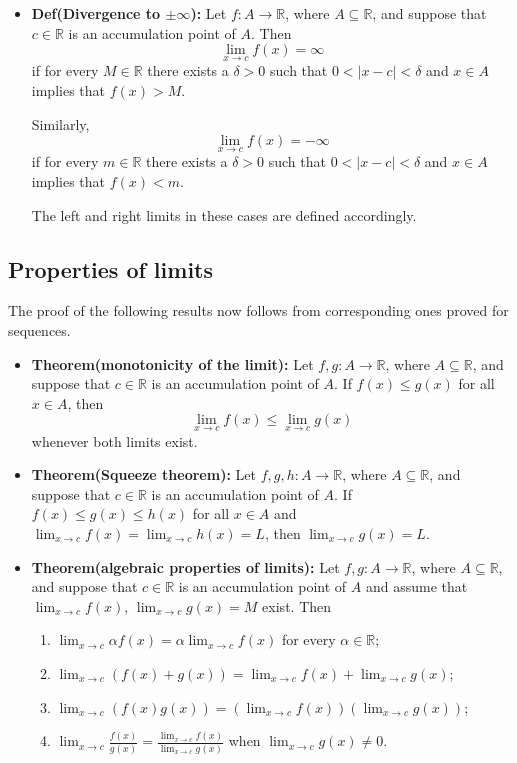 \documentclass{article}
\begin{document}
\begin{itemize}
\item \textbf{Def(Divergence to $\pm \infty$):} Let $f: A \to \mathbb{R}$, where $A \subseteq \mathbb{R}$, and suppose that $c \in \mathbb{R}$ is an accumulation point of $A$. Then
\[
\lim_{x \to c} f(x) = \infty
\]
if for every $M \in \mathbb{R}$ there exists a $\delta > 0$ such that $0 < |x - c| < \delta$ and $x \in A$ implies that $f(x) > M$.

Similarly,
\[
\lim_{x \to c} f(x) = -\infty
\]
if for every $m \in \mathbb{R}$ there exists a $\delta > 0$ such that $0 < |x - c| < \delta$ and $x \in A$ implies that $f(x) < m$.

The left and right limits in these cases are defined accordingly.
\end{itemize}

\subsection{Properties of limits}

The proof of the following results now follows from corresponding ones proved for sequences.

\begin{itemize}
\item \textbf{Theorem(monotonicity of the limit):} Let $f, g: A \to \mathbb{R}$, where $A \subseteq \mathbb{R}$, and suppose that $c \in \mathbb{R}$ is an accumulation point of $A$. If $f(x) \leq g(x)$ for all $x \in A$, then
\[
\lim_{x \to c} f(x) \leq \lim_{x \to c} g(x)
\]
whenever both limits exist.

\item \textbf{Theorem(Squeeze theorem):} Let $f, g, h: A \to \mathbb{R}$, where $A \subseteq \mathbb{R}$, and suppose that $c \in \mathbb{R}$ is an accumulation point of $A$. If $f(x) \leq g(x) \leq h(x)$ for all $x \in A$ and $\displaystyle \lim_{x \to c} f(x) = \lim_{x \to c} h(x) = L$, then $\displaystyle \lim_{x \to c} g(x) = L$.

\item \textbf{Theorem(algebraic properties of limits):} Let $f, g: A \to \mathbb{R}$, where $A \subseteq \mathbb{R}$, and suppose that $c \in \mathbb{R}$ is an accumulation point of $A$ and assume that $\displaystyle \lim_{x \to c} f(x)$, $\displaystyle \lim_{x \to c} g(x) = M$ exist. Then
\begin{enumerate}
    \item $\displaystyle \lim_{x \to c} \alpha f(x) = \alpha \lim_{x \to c}f(x)$ for every $\alpha \in \mathbb{R}$;
    \item $\displaystyle \lim_{x \to c} (f(x) + g(x)) = \lim_{x \to c}f(x) + \lim_{x \to c}g(x)$;
    \item $\displaystyle \lim_{x \to c} (f(x)g(x)) = (\lim_{x \to c}f(x))(\lim_{x \to c}g(x))$;
    \item $\displaystyle \lim_{x \to c} \frac{f(x)}{g(x)} = \frac{\displaystyle \lim_{x \to c}f(x)}{\displaystyle \lim_{x \to c}g(x)}$ when $\displaystyle \lim_{x \to c}g(x) \neq 0$.
\end{enumerate}
\end{itemize}
\end{document}
